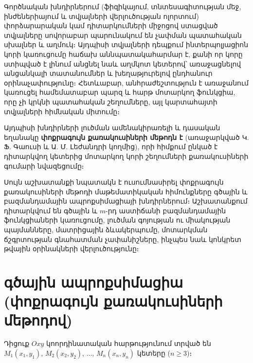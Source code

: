 \documentclass[12pt,a4paper]{article}
\numberwithin{equation}{section}
\numberwithin{figure}{section}
\begin{document}
\renewcommand{\thefigure}{\thesection.\arabic{figure}}

Գործնական խնդիրներում (ֆիզիկայում, տնտեսագիտության մեջ, ինժեներիայում և տվյալների վերլուծության ոլորտում) փորձարարական կամ դիտարկումների միջոցով ստացված տվյալները սովորաբար պարունակում են չափման պատահական սխալներ և աղմուկ։ Այդպիսի տվյալների դեպքում ինտերպոլյացիոն կորի կառուցումը հաճախ աննպատակահարմար է, քանի որ կորը ստիպված է լինում անցնել նաև աղմկոտ կետերով՝ առաջացնելով անցանկալի տատանումներ և խեղաթյուրելով ընդհանուր օրինաչափությունը։ Հետևաբար, անհրաժեշտություն է առաջանում կառուցել համեմատաբար պարզ և հարթ մոտարկող ֆունկցիա, որը չի կրկնի պատահական շեղումները, այլ կարտահայտի տվյալների հիմնական միտումը։

Այդպիսի խնդիրների լուծման ամենակիրառելի և դասական եղանակը \textbf{փոքրագույն քառակուսիների մեթոդն է} (առաջարկված Կ. Ֆ. Գաուսի և Ա. Մ. Լեժանդրի կողմից), որի հիմքում ընկած է դիտարկվող կետերից մոտարկող կորի շեղումների քառակուսիների գումարի նվազեցումը։

Սույն աշխատանքի նպատակն է ուսումնասիրել փոքրագույն քառակուսիների մեթոդի մաթեմատիկական հիմունքները գծային և բազմանդամային ապրոքսիմացիայի խնդիրներում։ Աշխատանքում դիտարկվում են գծային և $m$-րդ աստիճանի բազմանդամային ֆունկցիաների կառուցումը, լուծման գոյության ու միակության պայմանները, մատրիցային ձևակերպումը, մոտարկման ճշգրտության գնահատման չափանիշները, ինչպես նաև կոնկրետ թվային օրինակների վերլուծությունը։

\section[գծային ապրոքսիմացիա \texorpdfstring{\newline}{}(փոքրագույն քառակուսիների մեթոդով)]{գծային ապրոքսիմացիա (փոքրագույն քառակուսիների մեթոդով)}

Դիցուք $Oxy$ կոորդինատական հարթությունում տրված են $M_1(x_1, y_1)$, $M_2(x_2, y_2)$, $\dots$, $M_n(x_n, y_n)$ կետերը ($n \geqslant 3$)։
\end{document}
